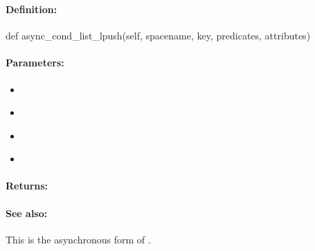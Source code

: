 \pagebreak
\subsubsection{}
\label{api:python:async_cond_list_lpush}


\paragraph{Definition:}
\begin{pythoncode}
def async_cond_list_lpush(self, spacename, key, predicates, attributes)
\end{pythoncode}

\paragraph{Parameters:}
\begin{itemize}[noitemsep]
\item {}\\

\item {}\\

\item {}\\

\item {}\\

\end{itemize}

\paragraph{Returns:}


\paragraph{See also:}  This is the asynchronous form of .

\pagebreak
\subsubsection{}
\label{api:python:list_rpush}



